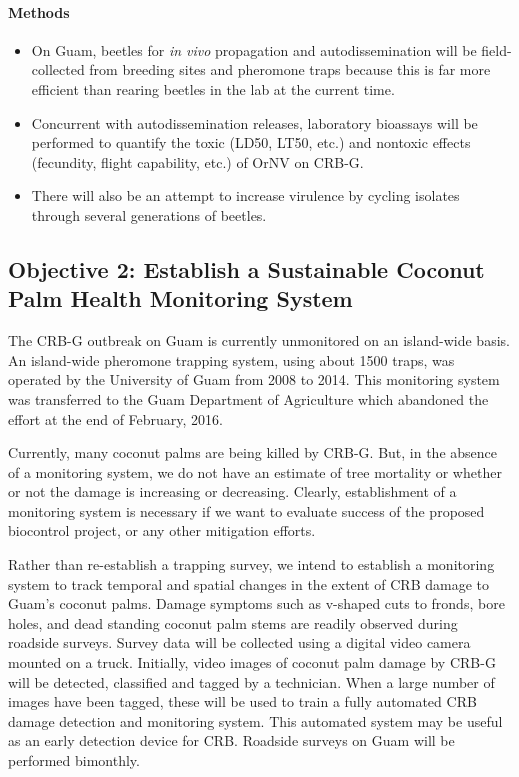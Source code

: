\documentclass[14pt,english,letterpaper]{scrartcl}
\begin{document}
\paragraph{Methods}

\begin{itemize}
\item On Guam, beetles for \textit{in vivo} propagation and autodissemination will be field-collected from
breeding sites and pheromone traps because this is far more efficient than rearing beetles in the lab at
the current time.

\item Concurrent with autodissemination releases, laboratory bioassays will be performed to quantify the toxic
(LD50, LT50, etc.) and nontoxic effects (fecundity, flight capability, etc.) of OrNV on CRB-G.

\item  There will also
be an attempt to increase virulence by cycling isolates through several generations of beetles. \end{itemize}

\subsection{Objective 2: Establish a Sustainable Coconut Palm Health Monitoring System}

The CRB-G outbreak on Guam is currently unmonitored on an island-wide basis. An island-wide
pheromone trapping system, using about 1500 traps, was operated by the University of Guam from 2008
to 2014. This monitoring system was transferred to the Guam Department of Agriculture which
abandoned the effort at the end of February, 2016. 

Currently, many coconut palms are being killed by
CRB-G. But, in the absence of a monitoring system, we do not have an estimate of tree mortality or
whether or not the damage is increasing or decreasing.
Clearly, establishment of a monitoring system is necessary if we want to evaluate success of the
proposed biocontrol project, or any other mitigation efforts. 

Rather than re-establish a trapping survey, we intend to establish a monitoring system
to track temporal and spatial changes in the extent of CRB damage to Guam’s coconut palms. Damage
symptoms such as v-shaped cuts to fronds, bore holes, and dead standing coconut palm stems are
readily observed during roadside surveys. Survey data will be collected using a digital video
camera mounted on a truck. Initially, video images of coconut palm damage by CRB-G will be detected,
classified and tagged by a technician. When a large number of images have been tagged, these will be
used to train a fully automated CRB damage detection and monitoring system. This automated system
may be useful as an early detection device for CRB. Roadside surveys on Guam will be performed
bimonthly.
\end{document}
